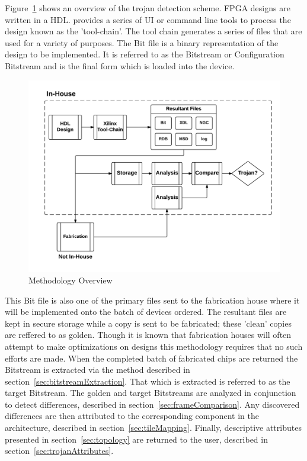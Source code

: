 Figure~\ref{fig:methodologyOverview} shows an overview of the trojan detection scheme.
\acrshort{FPGA} designs are written in a \acrfull{HDL}.
\Xilinx provides a series of \acrfull{UI} or command line tools to process the design known as the 'tool-chain'.
The tool chain generates a series of files that are used for a variety of purposes.
The Bit file is a binary representation of the design to be implemented.
It is referred to as the \gls{Bitstream} or Configuration \gls{Bitstream} and is the final form which is loaded into the device.
\begin{figure}
	\centering
	\includegraphics[width=1\linewidth]{Figures/methodologyOverview}
	\caption[Methodology Overview]{Methodology Overview}
	\label{fig:methodologyOverview}
\end{figure}
This Bit file is also one of the primary files sent to the fabrication house where it will be implemented onto the batch of devices ordered.
The resultant files are kept in secure storage while a copy is sent to be fabricated; these 'clean' copies are reffered to as \gls{golden}.
Though it is known that fabrication houses will often attempt to make optimizations on designs this methodology requires that no such efforts are made.
When the completed batch of fabricated chips are returned the \gls{Bitstream} is extracted via the method described in section~\ref{sec:bitstreamExtraction}. 
That which is extracted is referred to as the \gls{target} \gls{Bitstream}.
The \gls{golden} and \gls{target} \gls{Bitstream}s are analyzed in conjunction to detect differences, described in section~\ref{sec:frameComparison}.
Any discovered differences are then attributed to the corresponding component in the architecture, described in section~\ref{sec:tileMapping}.
Finally, descriptive attributes presented in section~\ref{sec:topology} are returned to the user, described in section~\ref{sec:trojanAttributes}. 

